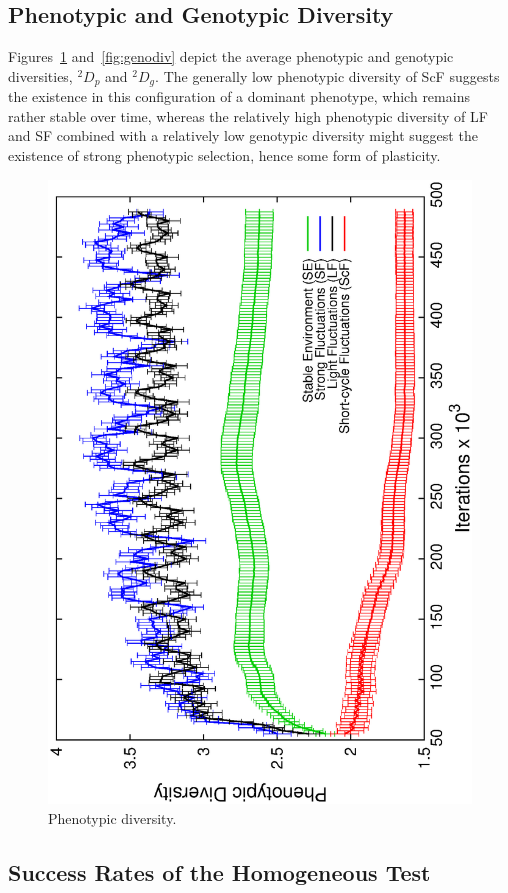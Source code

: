 \subsection{Phenotypic and Genotypic Diversity}

Figures~\ref{fig:phenodiv} and~\ref{fig:genodiv} depict the average phenotypic and genotypic diversities, $^2\!D_p$ and $^2\!D_g$. The generally low phenotypic diversity of ScF suggests the existence in this configuration of a dominant phenotype, which remains rather stable over time, whereas the relatively high phenotypic diversity of LF and SF combined with a relatively low genotypic diversity might suggest the existence of strong phenotypic selection, hence some form of plasticity.

\begin{figure}[h]
\centering
\includegraphics[width=0.7\columnwidth, angle=-90]{img/PhenoDiv}
\caption{Phenotypic diversity.}
\label{fig:phenodiv}
\end{figure}

\subsection{Success Rates of the Homogeneous Test}

